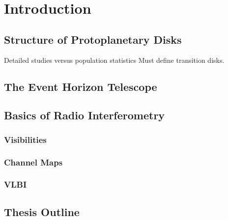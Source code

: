 \chapter{Introduction}\label{chapter:introduction}

\section{Structure of Protoplanetary Disks}

Detailed studies versus population statistics
Must define transition disks.

\citep{harris14}

\section{The Event Horizon Telescope}

\section{Basics of Radio Interferometry}
\subsection{Visibilities}
\subsection{Channel Maps}
\subsection{VLBI}

\section{Thesis Outline}


